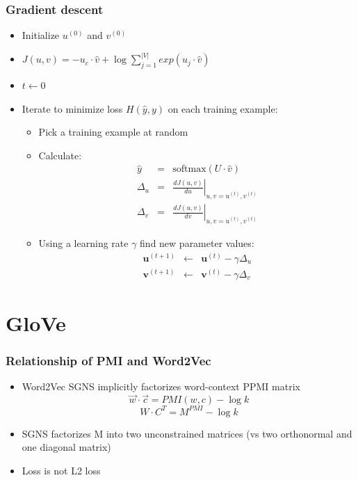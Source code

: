 \begin{frame}
\frametitle{Gradient descent}
\begin{itemize}[<+->]
\item Initialize $u^{(0)}$ and $v^{(0)}$ 
\item $J(u,v) = - u_c \cdot \hat{v} + \log \sum_{j=1}^{|V|} exp(u_j \cdot \hat{v})$
\item $t \leftarrow 0$
\item Iterate to minimize loss $H(\hat{y}, y)$ on each training example:
\begin{itemize}[<+->]
\item Pick a training example at random
\item Calculate: 
\begin{eqnarray*}
	\hat{y} &=& \textrm{softmax}(U \cdot \hat{v}) \\
	\Delta_u &=& \left. \frac{d J(u,v)}{d u}  \right|_{u,v = u^{(t)}, v^{(t)}} \\
	\Delta_v &=& \left. \frac{d J(u,v)}{d v}  \right|_{u,v = u^{(t)}, v^{(t)}}
\end{eqnarray*}
\item Using a learning rate $\gamma$ find new parameter values:
\begin{eqnarray*}
	\textbf{u}^{(t+1)} &\leftarrow& \textbf{u}^{(t)} - \gamma \Delta_u \\
	\textbf{v}^{(t+1)} &\leftarrow& \textbf{v}^{(t)} - \gamma \Delta_v
\end{eqnarray*}
\end{itemize}
\end{itemize}
\end{frame}

\section{GloVe}
\frame{\tableofcontents[currentsection]}

\begin{frame}
\frametitle{Relationship of PMI and Word2Vec}
\begin{itemize}[<+->]
\item Word2Vec SGNS implicitly factorizes word-context PPMI matrix
\begin{equation*}
\overrightarrow{w}\cdot\overrightarrow{c} = PMI(w,c) - \log k
\end{equation*}
\begin{equation*}
W \cdot C^T = M^{PMI} - \log k
\end{equation*}
\item SGNS factorizes M into two unconstrained matrices (vs two orthonormal and one diagonal matrix)
\item Loss is not L2 loss
\end{itemize}
\end{frame}


